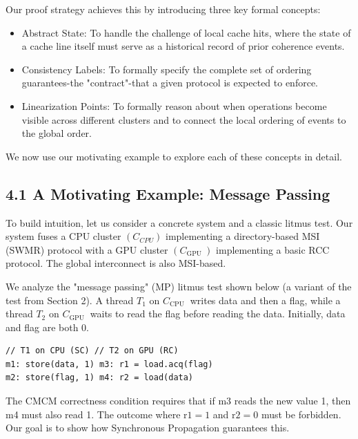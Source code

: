 \documentclass[10pt]{article}
\begin{document}
Our proof strategy achieves this by introducing three key formal concepts:

\begin{itemize}
  \item[-] Abstract State: To handle the challenge of local cache hits, where the state of a cache line itself must serve as a historical record of prior coherence events.
  \item[-] Consistency Labels: To formally specify the complete set of ordering guarantees-the "contract"-that a given protocol is expected to enforce.
  \item[-] Linearization Points: To formally reason about when operations become visible across different clusters and to connect the local ordering of events to the global order.
\end{itemize}

We now use our motivating example to explore each of these concepts in detail.

\subsection*{4.1 A Motivating Example: Message Passing}
To build intuition, let us consider a concrete system and a classic litmus test. Our system fuses a CPU cluster $\left(C_{C P U}\right)$ implementing a directory-based MSI (SWMR) protocol with a GPU cluster $\left(C_{\text {GPU }}\right)$ implementing a basic RCC protocol. The global interconnect is also MSI-based.

We analyze the "message passing" (MP) litmus test shown below (a variant of the test from Section 2). A thread $T_{1}$ on $C_{\text {CPU }}$ writes data and then a flag, while a thread $T_{2}$ on $C_{\text {GPU }}$ waits to read the flag before reading the data. Initially, data and flag are both 0.

\begin{verbatim}
// T1 on CPU (SC) // T2 on GPU (RC)
m1: store(data, 1) m3: r1 = load.acq(flag)
m2: store(flag, 1) m4: r2 = load(data)
\end{verbatim}

The CMCM correctness condition requires that if m3 reads the new value 1, then m4 must also read 1. The outcome where $\mathrm{r} 1=1$ and $\mathrm{r} 2=0$ must be forbidden. Our goal is to show how Synchronous Propagation guarantees this.
\end{document}
